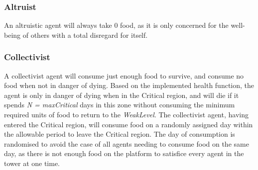 


\subsubsection{Altruist}
An altruistic agent will always take 0 food, as it is only concerned for the well-being of others with a total disregard for itself.

\subsubsection{Collectivist}
A collectivist agent will consume just enough food to survive, and consume no food when not in danger of dying. Based on the implemented health function, the agent is only in danger of dying when in the Critical region, and will die if it spends \textit{N = maxCritical} days in this zone without consuming the minimum required units of food to return to the \textit{WeakLevel}. The collectivist agent, having entered the Critical region, will consume food on a randomly assigned day within the allowable period to leave the Critical region. The day of consumption is randomised to avoid the case of all agents needing to consume food on the same day, as there is not enough food on the platform to satisfice every agent in the tower at one time.


